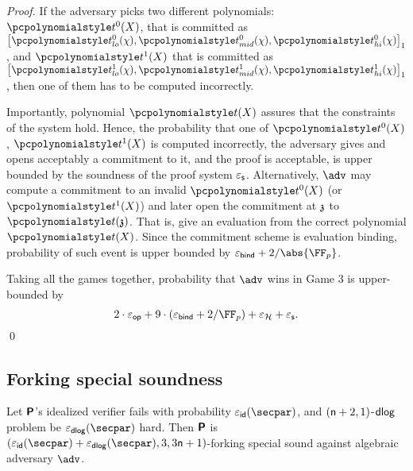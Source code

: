 \begin{proof}
  If the adversary picks two different polynomials: $\p{t^0}(X)$, that is committed
  as $\gone{\p{t^0_{lo}}(\chi), \p{t^0_{mid}}(\chi), \p{t^0_{hi}}(\chi)}$, and
  $\p{t^1}(X)$ that is committed as
  $\gone{\p{t^1_{lo}}(\chi), \p{t^1_{mid}}(\chi), \p{t^1_{hi}}(\chi)}$, then one of
  them has to be computed incorrectly. 

  Importantly, polynomial $\p{t}(X)$ assures that the constraints of the system
  hold. Hence, the probability that one of $\p{t^0}(X)$, $\p{t^1}(X)$ is computed
  incorrectly, the adversary gives and opens acceptably a commitment to it, and
  the proof is acceptable, is upper bounded by the soundness of the proof system
  $\varepsilon_{\mathsf{s}}$. Alternatively, $\adv$ may compute a commitment to an invalid
  $\p{t^0}(X)$ (or $\p{t^1}(X)$) and later open the commitment at $\mathfrak{z}$ to
  $\p{t}(\chz)$. That is, give an evaluation from the correct polynomial
  $\p{t}(X)$. Since the commitment scheme is evaluation binding, probability of
  such event is upper bounded by $\epsbinding + \infrac{2}{\abs{\FF_p}}$.

   Taking all the games together, probability that $\adv$ wins
  in Game 3 is upper-bounded by
  \[
    2 \cdot \epsop + 9 \cdot (\epsbind + \infrac{2}{\FF_p}) + \epsro + \epss.
  \]
  \qed
\end{proof}

\subsection{Forking special soundness}
\begin{lemma}
	\label{lem:plonkprot_ss}
	Let $\bm{\mathsf{P}}$'s idealized verifier fails with probability $\epsid (\secpar)$, and
	$(\mathsf{n} + 2, 1)$-$\mathsf{dlog}$ problem be $\epsdlog (\secpar)$ hard. Then $\bm{\mathsf{P}}$ is
	$(\epsid (\secpar) + \epsdlog (\secpar) , 3, 3 \noofc + 1)$-forking special sound against algebraic
	adversary $\adv$.
\end{lemma}

